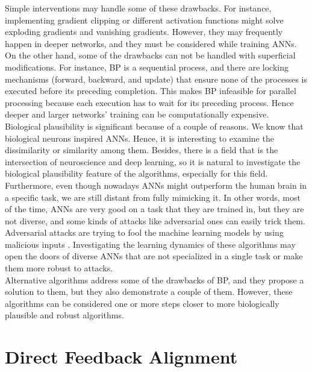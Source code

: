 \documentclass[a4paper, nobind]{templates/ociamthesis}
\begin{document}
\noindent Simple interventions may handle some of these drawbacks. For instance, implementing gradient clipping or different activation functions might solve exploding gradients and vanishing gradients. However, they may frequently happen in deeper networks, and they must be considered while training ANNs. On the other hand, some of the drawbacks can not be handled with superficial modifications. For instance, BP is a sequential process, and there are locking mechanisms (forward, backward, and update) that ensure none of the processes is executed before its preceding completion. This makes BP infeasible for parallel processing because each execution has to wait for its preceding process. Hence deeper and larger networks' training can be computationally expensive.\\
Biological plausibility is significant because of a couple of reasons. We know that biological neurons inspired ANNs. Hence, it is interesting to examine the dissimilarity or similarity among them. Besides, there is a field that is the intersection of neuroscience and deep learning, so it is natural to investigate the biological plausibility feature of the algorithms, especially for this field. Furthermore, even though nowadays ANNs might outperform the human brain in a specific task, we are still distant from fully mimicking it. In other words, most of the time, ANNs are very good on a task that they are trained in, but they are not diverse, and some kinds of attacks like adversarial ones can easily trick them. Adversarial attacks are trying to fool the machine learning models by using malicious inputs \cite{DBLP:journals/corr/KurakinGB16a}. Investigating the learning dynamics of these algorithms may open the doors of diverse ANNs that are not specialized in a single task or make them more robust to attacks.\\
Alternative algorithms address some of the drawbacks of BP, and they propose a solution to them, but they also demonstrate a couple of them. However, these algorithms can be considered one or more steps closer to more biologically plausible and robust algorithms.

\hypertarget{direct-feedback-alignment}{%
\section{Direct Feedback Alignment}\label{direct-feedback-alignment}}
\end{document}
